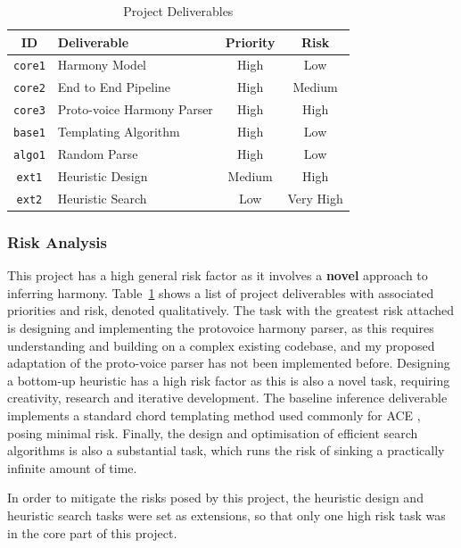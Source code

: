 \documentclass[12pt,a4paper,twoside,openany]{report} \usepackage[pdfborder={0 0 0}]{hyperref}    %
\theoremstyle{definition} \newtheorem{definition}{Definition}[section]
\begin{document}
\begin{table}[ht] \caption{Project Deliverables} 
  \vspace{\baselineskip} 
  \label{tab:deliverables} 
  \centering
  \begin{tabularx}{0.9\textwidth}{cXcc} 
    {\large \textbf{ID}} & \large \textbf{Deliverable} & \large \textbf{Priority} & \large \textbf{Risk} \\ 
    \toprule 
    \texttt{core1} & Harmony Model & High & Low \\ 
    \texttt{core2} & End to End Pipeline & High & Medium \\ 
    \texttt{core3} & Proto-voice Harmony Parser & High & High \\ 
    \texttt{base1} & Templating Algorithm & High & Low \\ 
    \texttt{algo1} & Random Parse & High & Low \\ 
    \texttt{ext1} & Heuristic Design & Medium & High \\
    \texttt{ext2} & Heuristic Search & Low & Very High \\
\end{tabularx} \end{table}

\subsubsection{Risk Analysis}
\label{sub:riskAnalysis}

This project has a high general risk factor as it involves a \textbf{novel} approach to inferring harmony. 
Table~\ref{tab:deliverables} shows a list of project
deliverables with associated priorities and risk, denoted qualitatively. 
The task with the greatest risk attached is designing and implementing the protovoice harmony parser, as this requires understanding and building on a complex existing codebase, and my proposed adaptation of the proto-voice parser has not been implemented before. 
Designing a bottom-up heuristic has a high risk factor as this is also a novel task, requiring creativity, research and iterative development. 
The baseline inference deliverable implements a standard chord templating method used commonly for ACE \cite{pardoAlgorithmsChordalAnalysis2002}, posing minimal risk. 
Finally, the design and optimisation of efficient search algorithms is also a substantial task, which runs the risk of sinking a practically infinite amount of time.

In order to mitigate the risks posed by this project, the heuristic design and heuristic search tasks were set as
extensions, so that only one high risk task was in the core part of this project.
\end{document}
